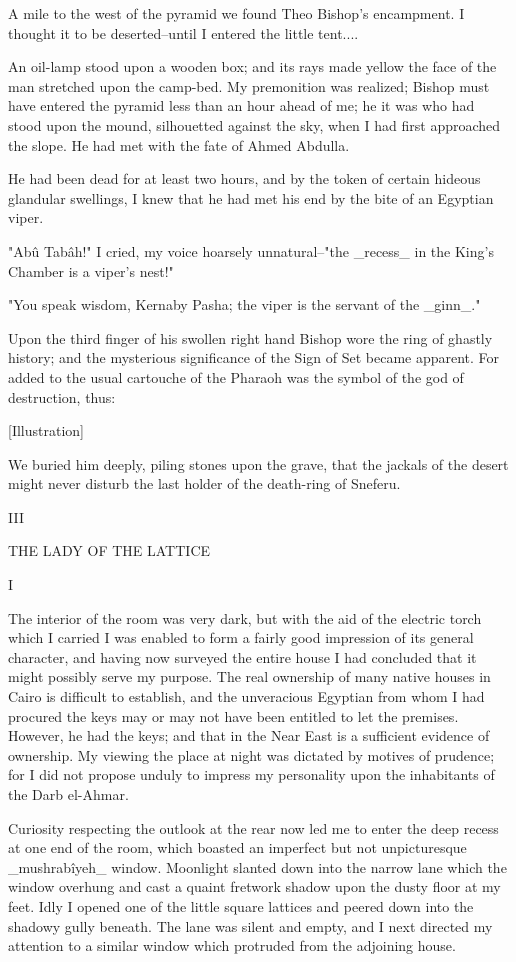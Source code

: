 A mile to the west of the pyramid we found Theo Bishop's encampment.
I thought it to be deserted--until I entered the little tent....

An oil-lamp stood upon a wooden box; and its rays made yellow the face
of the man stretched upon the camp-bed. My premonition was realized;
Bishop must have entered the pyramid less than an hour ahead of me;
he it was who had stood upon the mound, silhouetted against the sky,
when I had first approached the slope. He had met with the fate of
Ahmed Abdulla.

He had been dead for at least two hours, and by the token of certain
hideous glandular swellings, I knew that he had met his end by the
bite of an Egyptian viper.

"Abû Tabâh!" I cried, my voice hoarsely unnatural--"the _recess_ in
the King's Chamber is a viper's nest!"

"You speak wisdom, Kernaby Pasha; the viper is the servant of the
_ginn_."

Upon the third finger of his swollen right hand Bishop wore the ring
of ghastly history; and the mysterious significance of the Sign of Set
became apparent. For added to the usual cartouche of the Pharaoh was
the symbol of the god of destruction, thus:

[Illustration]

We buried him deeply, piling stones upon the grave, that the jackals
of the desert might never disturb the last holder of the death-ring of
Sneferu.




III

THE LADY OF THE LATTICE


I

The interior of the room was very dark, but with the aid of the
electric torch which I carried I was enabled to form a fairly good
impression of its general character, and having now surveyed the
entire house I had concluded that it might possibly serve my purpose.
The real ownership of many native houses in Cairo is difficult to
establish, and the unveracious Egyptian from whom I had procured the
keys may or may not have been entitled to let the premises. However,
he had the keys; and that in the Near East is a sufficient evidence of
ownership. My viewing the place at night was dictated by motives of
prudence; for I did not propose unduly to impress my personality upon
the inhabitants of the Darb el-Ahmar.

Curiosity respecting the outlook at the rear now led me to enter the
deep recess at one end of the room, which boasted an imperfect but not
unpicturesque _mushrabîyeh_ window. Moonlight slanted down into the
narrow lane which the window overhung and cast a quaint fretwork
shadow upon the dusty floor at my feet. Idly I opened one of the
little square lattices and peered down into the shadowy gully beneath.
The lane was silent and empty, and I next directed my attention to a
similar window which protruded from the adjoining house.

